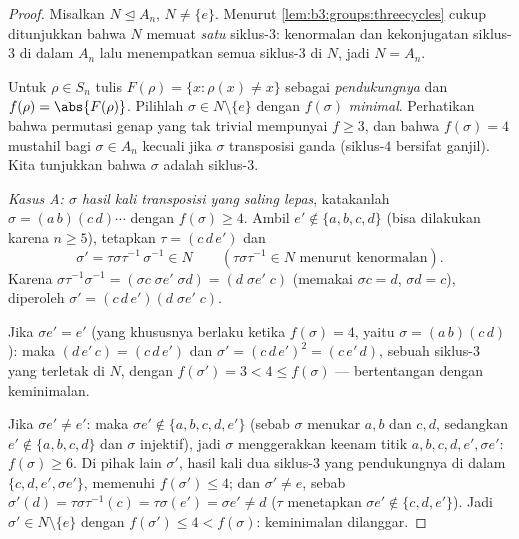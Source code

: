 \begin{proof}
Misalkan $N \trianglelefteq A_n$, $N \neq \{e\}$. Menurut
\cref{lem:b3:groups:threecycles} cukup ditunjukkan bahwa $N$
memuat \emph{satu} siklus-$3$: kenormalan dan kekonjugatan
siklus-$3$ di dalam $A_n$ lalu menempatkan semua siklus-$3$ di $N$, jadi $N = A_n$.

Untuk $\rho \in S_n$ tulis $F(\rho) = \{x : \rho(x) \neq x\}$ sebagai
\emph{pendukungnya} dan $f(\rho) = \abs{F(\rho)}$. Pilihlah $\sigma \in N
\setminus \{e\}$ dengan $f(\sigma)$ \emph{minimal}. Perhatikan bahwa
permutasi genap yang tak trivial mempunyai $f \geq 3$, dan bahwa $f(\sigma) =
4$ mustahil bagi $\sigma \in A_n$ kecuali jika $\sigma$ transposisi
ganda (siklus-$4$ bersifat ganjil). Kita tunjukkan bahwa $\sigma$ adalah
siklus-$3$.

\emph{Kasus A: $\sigma$ hasil kali transposisi yang saling lepas},
katakanlah $\sigma = (a\,b)(c\,d)\cdots$ dengan $f(\sigma) \geq 4$. Ambil $e'
\notin \{a, b, c, d\}$ (bisa dilakukan karena $n \geq 5$), tetapkan $\tau =
(c\,d\,e')$ dan
\[
\sigma' = \tau\sigma\tau^{-1}\,\sigma^{-1} \in N
\qquad (\tau\sigma\tau^{-1} \in N \text{ menurut kenormalan}).
\]
Karena $\sigma\tau^{-1}\sigma^{-1} = (\sigma c\;\sigma e'\;\sigma
d) = (d\;\sigma e'\;c)$ (memakai $\sigma c = d$, $\sigma d = c$),
diperoleh $\sigma' = (c\,d\,e')(d\;\sigma e'\;c)$.

Jika $\sigma e' = e'$ (yang khususnya berlaku ketika $f(\sigma) =
4$, yaitu $\sigma = (a\,b)(c\,d)$): maka $(d\,e'\,c) =
(c\,d\,e')$ dan $\sigma' = (c\,d\,e')^2 = (c\,e'\,d)$, sebuah
siklus-$3$ yang terletak di $N$, dengan $f(\sigma') = 3 < 4 \leq f(\sigma)$
--- bertentangan dengan keminimalan.

Jika $\sigma e' \neq e'$: maka $\sigma e' \notin \{a, b, c, d,
e'\}$ (sebab $\sigma$ menukar $a,b$ dan $c,d$, sedangkan $e' \notin \{a,b,c,d\}$
dan $\sigma$ injektif), jadi $\sigma$ menggerakkan keenam titik $a, b,
c, d, e', \sigma e'$: $f(\sigma) \geq 6$. Di pihak lain
$\sigma'$, hasil kali dua siklus-$3$ yang pendukungnya di dalam $\{c, d,
e', \sigma e'\}$, memenuhi $f(\sigma') \leq 4$; dan $\sigma' \neq
e$, sebab $\sigma'(d) = \tau\sigma\tau^{-1}(c) = \tau\sigma(e') =
\sigma e' \neq d$ ($\tau$ menetapkan $\sigma e' \notin \{c,d,e'\}$).
Jadi $\sigma' \in N \setminus\{e\}$ dengan $f(\sigma') \leq 4 <
f(\sigma)$: keminimalan dilanggar.


\end{proof}
